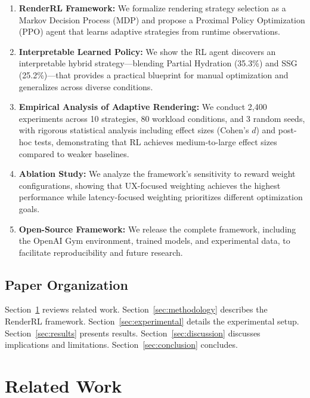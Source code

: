 \documentclass[10pt,twocolumn]{article}
\newcommand{\method}{RenderRL}
\begin{document}
\begin{enumerate}[nosep]
\item \textbf{\method{} Framework:} We formalize rendering strategy selection as a Markov Decision Process (MDP) and propose a Proximal Policy Optimization (PPO) agent that learns adaptive strategies from runtime observations.

\item \textbf{Interpretable Learned Policy:} We show the RL agent discovers an interpretable hybrid strategy---blending Partial Hydration (35.3\%) and SSG (25.2\%)---that provides a practical blueprint for manual optimization and generalizes across diverse conditions.

\item \textbf{Empirical Analysis of Adaptive Rendering:} We conduct 2,400 experiments across 10 strategies, 80 workload conditions, and 3 random seeds, with rigorous statistical analysis including effect sizes (Cohen's $d$) and post-hoc tests, demonstrating that RL achieves medium-to-large effect sizes compared to weaker baselines.

\item \textbf{Ablation Study:} We analyze the framework's sensitivity to reward weight configurations, showing that UX-focused weighting achieves the highest performance while latency-focused weighting prioritizes different optimization goals.

\item \textbf{Open-Source Framework:} We release the complete framework, including the OpenAI Gym environment, trained models, and experimental data, to facilitate reproducibility and future research.
\end{enumerate}

\subsection{Paper Organization}

Section~\ref{sec:related} reviews related work. Section~\ref{sec:methodology} describes the \method{} framework. Section~\ref{sec:experimental} details the experimental setup. Section~\ref{sec:results} presents results. Section~\ref{sec:discussion} discusses implications and limitations. Section~\ref{sec:conclusion} concludes.

\section{Related Work}
\label{sec:related}
\end{document}
